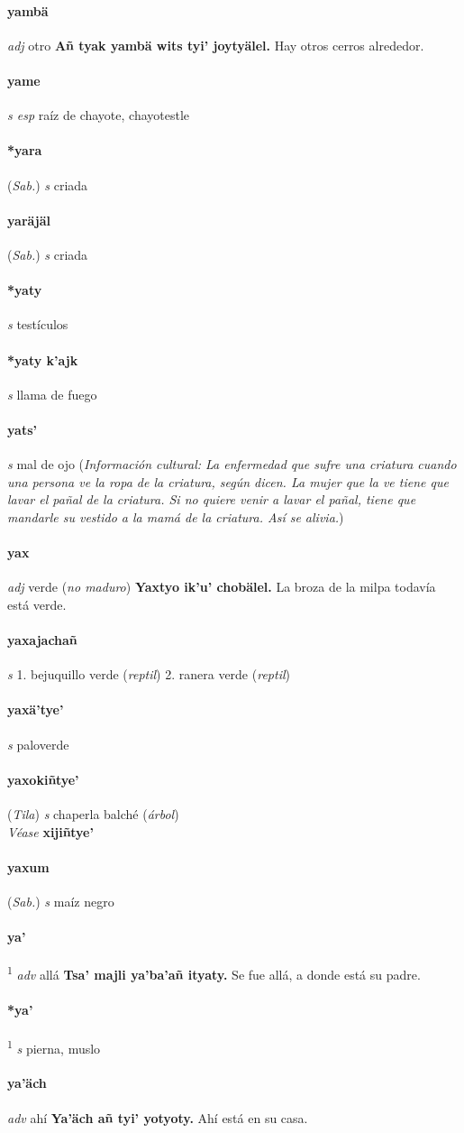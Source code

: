 \documentclass{scrbook}
\newcommand{\entry}[1]{\paragraph{#1}}
\newcommand{\onedefinition}[1]{#1.}
\newcommand{\defsuperscript}[1]{\textsuperscript{1}}
\newcommand{\partofspeech}[1]{\textit{#1}}
\newcommand{\spanishtranslation}[1]{#1}
\newcommand{\clarification}[1]{(\textit{#1})}
\newcommand{\cholexample}[1]{\textbf{#1}}
\newcommand{\exampletranslation}[1]{#1}
\newcommand{\alsosee}[1]{\\\textit{Véase} \textbf{#1}}
\newcommand{\relevantdialect}[1]{(\textit{#1})}
\newcommand{\culturalinformation}[1]{(\textit{#1})}
\begin{document}
\begin{multicols}{2}
\entry{yambä}
\partofspeech{adj}
\spanishtranslation{otro}
\cholexample{Añ tyak yambä wits tyi' joytyälel.}
\exampletranslation{Hay otros cerros alrededor.}

\entry{yame}
\partofspeech{s esp}
\spanishtranslation{raíz de chayote, chayotestle}

\entry{*yara}
\relevantdialect{Sab.}
\partofspeech{s}
\spanishtranslation{criada}

\entry{yaräjäl}
\relevantdialect{Sab.}
\partofspeech{s}
\spanishtranslation{criada}

\entry{*yaty}
\partofspeech{s}
\spanishtranslation{testículos}

\entry{*yaty k'ajk}
\partofspeech{s}
\spanishtranslation{llama de fuego}

\entry{yats'}
\partofspeech{s}
\spanishtranslation{mal de ojo}
\culturalinformation{Información cultural: La enfermedad que sufre una criatura cuando una persona ve la ropa de la criatura, según dicen. La mujer que la ve tiene que lavar el pañal de la criatura. Si no quiere venir a lavar el pañal, tiene que mandarle su vestido a la mamá de la criatura. Así se alivia.}

\entry{yax}
\partofspeech{adj}
\spanishtranslation{verde}
\clarification{no maduro}
\cholexample{Yaxtyo ik'u' chobälel.}
\exampletranslation{La broza de la milpa todavía está verde.}

\entry{yaxajachañ}
\partofspeech{s}
\onedefinition{1}
\spanishtranslation{bejuquillo verde}
\clarification{reptil}
\onedefinition{2}
\spanishtranslation{ranera verde}
\clarification{reptil}

\entry{yaxä'tye'}
\partofspeech{s}
\spanishtranslation{paloverde}

\entry{yaxokiñtye'}
\relevantdialect{Tila}
\partofspeech{s}
\spanishtranslation{chaperla}
\spanishtranslation{balché}
\clarification{árbol}
\alsosee{xijiñtye'}

\entry{yaxum}
\relevantdialect{Sab.}
\partofspeech{s}
\spanishtranslation{maíz negro}

\entry{ya'}
\defsuperscript{1}
\partofspeech{adv}
\spanishtranslation{allá}
\cholexample{Tsa' majli ya'ba'añ ityaty.}
\exampletranslation{Se fue allá, a donde está su padre.}

\entry{*ya'}
\defsuperscript{2}
\partofspeech{s}
\spanishtranslation{pierna, muslo}

\entry{ya'äch}
\partofspeech{adv}
\spanishtranslation{ahí}
\cholexample{Ya'äch añ tyi' yotyoty.}
\exampletranslation{Ahí está en su casa.}


\end{multicols}
\end{document}
